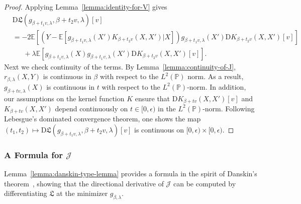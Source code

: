 \documentclass[sn-mathphys-num]{sn-jnl}%
\numberwithin{equation}{section}
\newcommand{\E}{\mathbb{E}}
\newcommand{\kernel}{K}
\renewcommand{\P}{\mathbb{P}}
\newcommand{\eps}{\epsilon}
\theoremstyle{thmstyleone}%
\theoremstyle{thmstyletwo}%
\theoremstyle{thmstylethree}%
\begin{document}
\begin{proof}
Applying Lemma~\ref{lemma:identity-for-V} gives
\begin{equation*}
\begin{split} 
	&\mathrm{D} \mathfrak{L}(g_{\beta + t_1 v, \lambda}, \beta + t_2 v, \lambda)[v] \\ &=
		-2\E[(Y-\E[g_{\beta + t_1 v, \lambda}(X') \kernel_{\beta + t_2 v} (X, X')|X]) g_{\beta + t_1 v, \lambda} (X') \mathrm{D} \kernel_{\beta + t_2 v}(X, X')[v]] \\
			&~~~~~~~+ \lambda \E[g_{\beta + t_1 v, \lambda}(X) g_{\beta + t_1 v, \lambda}(X')
				\mathrm{D} \kernel_{\beta + t_2 v}(X, X')[v]].
\end{split} 
\end{equation*}
Next we check continuity of the terms. 
By Lemma~\ref{lemma:continuity-of-J}, $r_{\beta, \lambda}(X, Y)$ is continuous in $\beta$ with respect to 
the $L^2(\P)$ norm. As a result, $g_{\beta + t v, \lambda}(X)$ is continuous in $t$ with respect to the $L^2(\P)$-norm. 
In addition, our assumptions 
on the kernel function $\kernel$ ensure that $\mathrm{D} \kernel_{\beta + tv}(X, X')[v]$ and 
$\kernel_{\beta + tv}(X, X')$ depend continuously on $t \in [0, \eps)$ in the $L^2(\P)$-norm.
Following  Lebesgue's dominated convergence theorem, one shows the map 
$(t_1, t_2) \mapsto \mathrm{D} \mathfrak{L}(g_{\beta + t_1 v, \lambda}, \beta + t_2 v, \lambda)[v]$
is continuous on $[0, \eps) \times [0, \eps)$.
\end{proof} 

\subsubsection{A Formula for $\mathcal{J}$}
\label{sec:danskin-type-formula}
Lemma~\ref{lemma:danskin-type-lemma} provides a formula in the spirit of Danskin's theorem~\cite{Danskin67}, showing that the directional derivative of $\mathcal{J}$ can be computed by differentiating $\mathfrak{L}$ at the minimizer $g_{\beta,\lambda}$.
\end{document}
